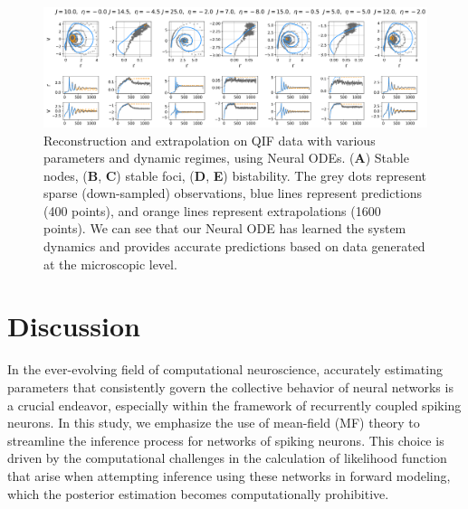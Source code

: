 \documentclass[preprint,11pt,authoryear]{elsarticle}
\begin{document}





\begin{figure}
    \centering
    \includegraphics[width=\linewidth]{Figs/Fig10.png}
    \caption{Reconstruction and extrapolation on QIF data with various parameters and dynamic regimes, using Neural ODEs. (\textbf{A}) Stable nodes, (\textbf{B}, \textbf{C}) stable foci, (\textbf{D}, \textbf{E}) bistability. The grey dots represent sparse (down-sampled) observations, blue lines represent predictions (400 points), and orange lines represent extrapolations (1600 points). We can see that our Neural ODE has learned the system dynamics and provides accurate predictions based on data generated at the microscopic level.} 
    \label{fig:NeuralODE_QIF}
\end{figure}



\section{Discussion}

In the ever-evolving field of computational neuroscience, accurately estimating parameters that consistently govern the collective behavior of neural networks is a crucial endeavor, especially within the framework of recurrently coupled spiking neurons. In this study, we emphasize the use of mean-field (MF) theory to streamline the inference process for networks of spiking neurons. This choice is driven by the computational challenges in the calculation of likelihood function that arise when attempting inference using these networks in forward modeling, which the posterior estimation becomes computationally prohibitive.
\end{document}
